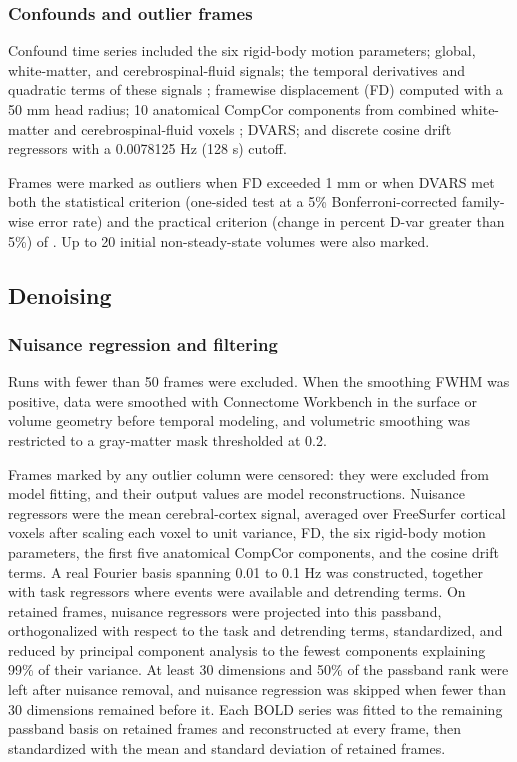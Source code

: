 \subsubsection*{Confounds and outlier frames}

Confound time series included the six rigid-body motion parameters; global, white-matter, and cerebrospinal-fluid signals; the temporal derivatives and quadratic terms of these signals \citep{satterthwaite2013confound}; framewise displacement (FD) \citep{power2012spurious} computed with a 50 mm head radius; 10 anatomical CompCor components from combined white-matter and cerebrospinal-fluid voxels \citep{behzadi2007compcor}; DVARS; and discrete cosine drift regressors with a 0.0078125 Hz (128 s) cutoff.

Frames were marked as outliers when FD exceeded 1 mm or when DVARS met both the statistical criterion (one-sided test at a 5\% Bonferroni-corrected family-wise error rate) and the practical criterion (change in percent D-var greater than 5\%) of \citet{afyouni2018dvars}. Up to 20 initial non-steady-state volumes were also marked.

\subsection*{Denoising}

\subsubsection*{Nuisance regression and filtering}

Runs with fewer than 50 frames were excluded. When the smoothing FWHM was positive, data were smoothed with Connectome Workbench \citep{marcus2011workbench} in the surface or volume geometry before temporal modeling, and volumetric smoothing was restricted to a gray-matter mask thresholded at 0.2.

Frames marked by any outlier column were censored: they were excluded from model fitting, and their output values are model reconstructions. Nuisance regressors were the mean cerebral-cortex signal, averaged over FreeSurfer cortical voxels after scaling each voxel to unit variance, FD, the six rigid-body motion parameters, the first five anatomical CompCor components, and the cosine drift terms. A real Fourier basis spanning 0.01 to 0.1 Hz was constructed, together with task regressors where events were available and detrending terms. On retained frames, nuisance regressors were projected into this passband, orthogonalized with respect to the task and detrending terms, standardized, and reduced by principal component analysis to the fewest components explaining 99\% of their variance. At least 30 dimensions and 50\% of the passband rank were left after nuisance removal, and nuisance regression was skipped when fewer than 30 dimensions remained before it. Each BOLD series was fitted to the remaining passband basis on retained frames and reconstructed at every frame, then standardized with the mean and standard deviation of retained frames.

